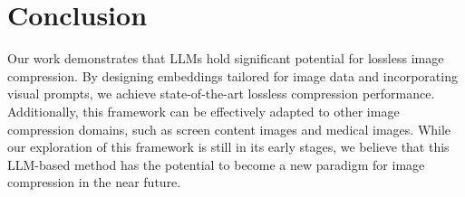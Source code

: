 \section{Conclusion}

Our work demonstrates that LLMs hold significant potential for lossless image compression. By designing embeddings tailored for image data and incorporating visual prompts, we achieve state-of-the-art lossless compression performance. Additionally, this framework can be effectively adapted to other image compression domains, such as screen content images and medical images. 
While our exploration of this framework is still in its early stages, we believe that this LLM-based method has the potential to become a new paradigm for image compression in the near future.